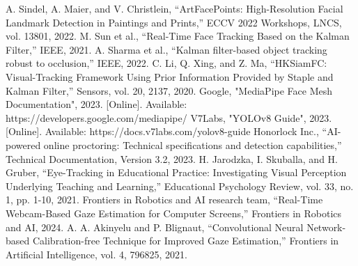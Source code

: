 \documentclass[conference]{IEEEtran}
\begin{document}
\begin{thebibliography}{23}
 A. Sindel, A. Maier, and V. Christlein, ``ArtFacePoints: High-Resolution Facial Landmark Detection in Paintings and Prints,'' ECCV 2022 Workshops, LNCS, vol. 13801, 2022.
 M. Sun et al., ``Real-Time Face Tracking Based on the Kalman Filter,'' IEEE, 2021.
 A. Sharma et al., ``Kalman filter-based object tracking robust to occlusion,'' IEEE, 2022.
 C. Li, Q. Xing, and Z. Ma, ``HKSiamFC: Visual-Tracking Framework Using Prior Information Provided by Staple and Kalman Filter,'' Sensors, vol. 20, 2137, 2020.
 Google, "MediaPipe Face Mesh Documentation", 2023. [Online]. Available: https://developers.google.com/mediapipe/
 V7Labs, "YOLOv8 Guide", 2023. [Online]. Available: https://docs.v7labs.com/yolov8-guide
 Honorlock Inc., ``AI-powered online proctoring: Technical specifications and detection capabilities,'' Technical Documentation, Version 3.2, 2023.
 H. Jarodzka, I. Skuballa, and H. Gruber, ``Eye-Tracking in Educational Practice: Investigating Visual Perception Underlying Teaching and Learning,'' Educational Psychology Review, vol. 33, no. 1, pp. 1-10, 2021.
 Frontiers in Robotics and AI research team, ``Real-Time Webcam-Based Gaze Estimation for Computer Screens,'' Frontiers in Robotics and AI, 2024.
 A. A. Akinyelu and P. Blignaut, ``Convolutional Neural Network-based Calibration-free Technique for Improved Gaze Estimation,'' Frontiers in Artificial Intelligence, vol. 4, 796825, 2021.
\end{thebibliography}
\end{document}
